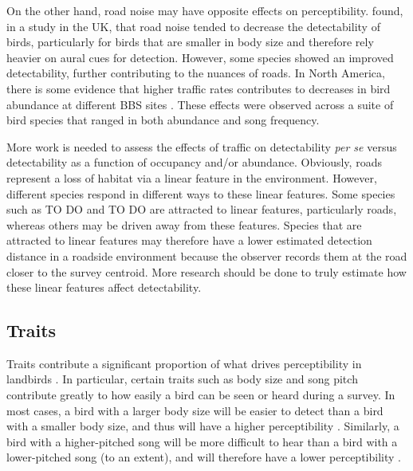 \par On the other hand, road noise may have opposite effects on perceptibility.
\citet{cooke_road_2020} found, in a study in the UK, that road noise tended to decrease the detectability of birds, particularly for birds that are smaller in body size and therefore rely heavier on aural cues for detection.
However, some species showed an improved detectability, further contributing to the nuances of roads.
In North America, there is some evidence that higher traffic rates contributes to decreases in bird abundance at different BBS sites \citep{griffith_traffic_2010}.
These effects were observed across a suite of bird species that ranged in both abundance and song frequency.

\par More work is needed to assess the effects of traffic on detectability \textit{per se} versus detectability as a function of occupancy and/or abundance.
Obviously, roads represent a loss of habitat via a linear feature in the environment.
However, different species respond in different ways to these linear features.
Some species such as TO DO and TO DO are attracted to linear features, particularly roads, whereas others may be driven away from these features.
Species that are attracted to linear features may therefore have a lower estimated detection distance in a roadside environment because the observer records them at the road closer to the survey centroid.
More research should be done to truly estimate how these linear features affect detectability.


\subsection{Traits}

\par Traits contribute a significant proportion of what drives perceptibility in landbirds \citep{seoane_species-specific_2005, garrard_general_2013, denis_biological_2017, johnston_species_2014, solymos_phylogeny_2018}.
In particular, certain traits such as body size and song pitch contribute greatly to how easily a bird can be seen or heard during a survey.
In most cases, a bird with a larger body size will be easier to detect than a bird with a smaller body size, and thus will have a higher perceptibility \citep{bowman_adaptive_1979, fletcher_acoustics_1999}.
Similarly, a bird with a higher-pitched song will be more difficult to hear than a bird with a lower-pitched song (to an extent), and will therefore have a lower perceptibility \citep{morton_ecological_1975}.

